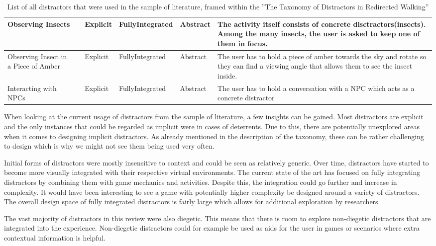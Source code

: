 \begin{sidewaystable}[p!]
\begin{tabularx}{\textwidth}{|m{2cm}|m{1.5cm}|m{2cm}|m{1.9cm}|m{2cm}|m{7.55cm}|}
\hline
Observing Insects & \cite{sra2018vmotion} & Explicit & Fully\newline Integrated & Abstract & The activity itself consists of concrete disctractors(insects). Among the many insects, the user is asked to keep one of them in focus.\\
\hline
Observing Insect in a Piece of Amber & \cite{sra2018vmotion} & Explicit & Fully\newline Integrated & Abstract & The user has to hold a piece of amber towards the sky and rotate so they can find a viewing angle that allows them to see the insect inside.\\
\hline
Interacting with NPCs & \cite{sra2018vmotion} & Explicit & Fully\newline Integrated & Abstract & The user has to hold a conversation with a NPC which acts as a concrete distractor\\
\hline
\end{tabularx}
\caption{List of all distractors that were used in the sample of literature, framed within the ''The Taxonomy of Distractors in Redirected Walking''}
\label{table:DistractorsInLiterature}
\end{sidewaystable}
When looking at the current usage of distractors from the sample of literature, a few insights can be gained. Most distractors are explicit and the only instances that could be regarded as implicit were in cases of deterrents. Due to this, there are potentially unexplored areas when it comes to designing implicit distractors. As already mentioned in the description of the taxonomy, these can be rather challenging to design which is why we might not see them being used very often. 

Initial forms of distractors were mostly insensitive to context and could be seen as relatively generic. Over time, distractors have started to become more visually integrated with their respective virtual environments. The current state of the art has focused on fully integrating distractors by combining them with game mechanics and activities. Despite this, the integration could go further and increase in complexity. It would have been interesting to see a game with potentially higher complexity be designed around a variety of distractors. The overall design space of fully integrated distractors is fairly large which allows for additional exploration by researchers.  

The vast majority of distractors in this review were also diegetic. This means that there is room to explore non-diegetic distractors that are integrated into the experience. Non-diegetic distractors could for example be used as aids for the user in games or scenarios where extra contextual information is helpful. 

